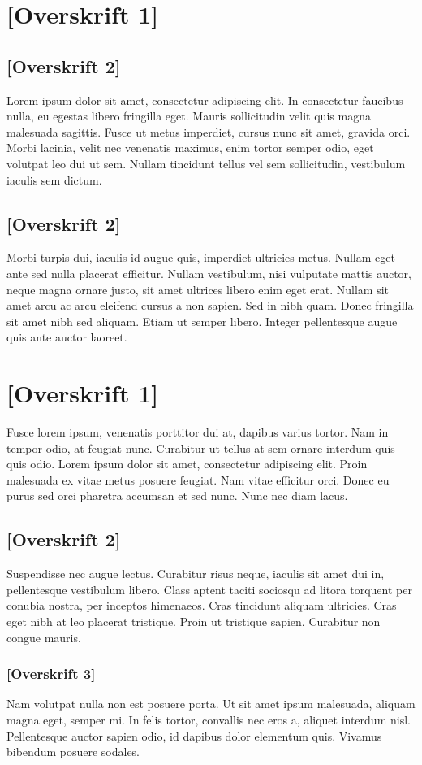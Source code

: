 \documentclass[12pt]{article}
\begin{document}
{\selectfont

\section{[Overskrift 1]}

\subsection{[Overskrift 2]}

Lorem ipsum dolor sit amet, consectetur adipiscing elit. In consectetur faucibus nulla, eu egestas libero fringilla eget. Mauris sollicitudin velit quis magna malesuada sagittis. Fusce ut metus imperdiet, cursus nunc sit amet, gravida orci. Morbi lacinia, velit nec venenatis maximus, enim tortor semper odio, eget volutpat leo dui ut sem. Nullam tincidunt tellus vel sem sollicitudin, vestibulum iaculis sem dictum. 

\subsection{[Overskrift 2]}

Morbi turpis dui, iaculis id augue quis, imperdiet ultricies metus. Nullam eget ante sed nulla placerat efficitur. Nullam vestibulum, nisi vulputate mattis auctor, neque magna ornare justo, sit amet ultrices libero enim eget erat. Nullam sit amet arcu ac arcu eleifend cursus a non sapien. Sed in nibh quam. Donec fringilla sit amet nibh sed aliquam. Etiam ut semper libero. Integer pellentesque augue quis ante auctor laoreet.

\section{[Overskrift 1]}

Fusce lorem ipsum, venenatis porttitor dui at, dapibus varius tortor. Nam in tempor odio, at feugiat nunc. Curabitur ut tellus at sem ornare interdum quis quis odio. Lorem ipsum dolor sit amet, consectetur adipiscing elit. Proin malesuada ex vitae metus posuere feugiat. Nam vitae efficitur orci. Donec eu purus sed orci pharetra accumsan et sed nunc. Nunc nec diam lacus.

\subsection{[Overskrift 2]}

Suspendisse nec augue lectus. Curabitur risus neque, iaculis sit amet dui in, pellentesque vestibulum libero. Class aptent taciti sociosqu ad litora torquent per conubia nostra, per inceptos himenaeos. Cras tincidunt aliquam ultricies. Cras eget nibh at leo placerat tristique. Proin ut tristique sapien. Curabitur non congue mauris.

\subsubsection{[Overskrift 3]}

Nam volutpat nulla non est posuere porta. Ut sit amet ipsum malesuada, aliquam magna eget, semper mi. In felis tortor, convallis nec eros a, aliquet interdum nisl. Pellentesque auctor sapien odio, id dapibus dolor elementum quis. Vivamus bibendum posuere sodales.

}
\end{document}
